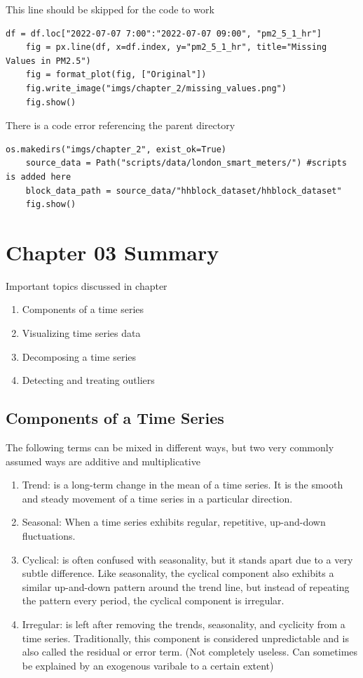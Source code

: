 \documentclass{article}
\begin{document}
This line should be skipped for the code to work
\lstset{language=Python}
\begin{lstlisting}[frame=single]
    df = df.loc["2022-07-07 7:00":"2022-07-07 09:00", "pm2_5_1_hr"]
    fig = px.line(df, x=df.index, y="pm2_5_1_hr", title="Missing Values in PM2.5")
    fig = format_plot(fig, ["Original"])
    fig.write_image("imgs/chapter_2/missing_values.png")
    fig.show()
\end{lstlisting}

There is a code error referencing the parent directory
\begin{lstlisting}[frame=single]
    os.makedirs("imgs/chapter_2", exist_ok=True)
    source_data = Path("scripts/data/london_smart_meters/") #scripts is added here
    block_data_path = source_data/"hhblock_dataset/hhblock_dataset"
    fig.show()
\end{lstlisting}


\section{Chapter 03 Summary}
Important topics discussed in chapter
\begin{enumerate}
    \item Components of a time series
    \item Visualizing time series data
    \item Decomposing a time series
    \item Detecting and treating outliers
\end{enumerate}

\subsection{Components of a Time Series}
The following terms can be mixed in different ways, but two very commonly assumed ways are additive and multiplicative
\begin{enumerate}
    \item Trend: is a long-term change in the mean of a time series. It is the smooth and steady movement of
    a time series in a particular direction.
    \item Seasonal: When a time series exhibits regular, repetitive, up-and-down fluctuations.
    \item Cyclical: is often confused with seasonality, but it stands apart due to a very subtle
    difference. Like seasonality, the cyclical component also exhibits a similar up-and-down pattern around
    the trend line, but instead of repeating the pattern every period, the cyclical component is irregular.
    \item Irregular: is left after removing the trends, seasonality, and cyclicity from a time series.
    Traditionally, this component is considered unpredictable and is also called the residual or error term. (Not completely useless. Can sometimes be explained by an exogenous varibale to a certain extent)
\end{enumerate}
\end{document}
